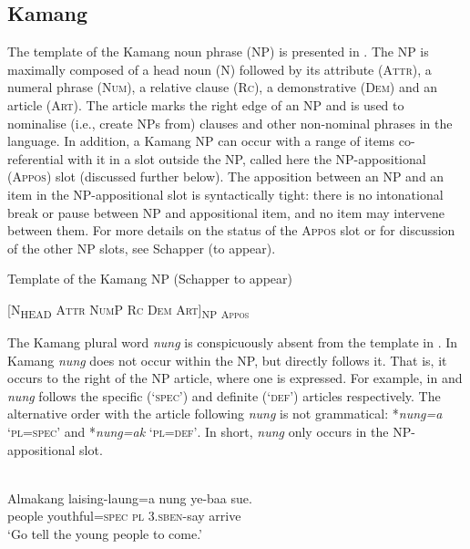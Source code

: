 \subsection{Kamang} %
\label{sec:9:3.3}
The template of the Kamang noun phrase (NP) is presented in . The NP is maximally composed of a head noun (\textsc{N}) followed by its attribute (\textsc{Attr),} a numeral phrase \textsc{(Num)}, a relative clause (\textsc{Rc}), a demonstrative \textsc{(Dem)} and an article \textsc{(Art)}. The article marks the right edge of an NP and is used to nominalise (i.e., create NPs from) clauses and other non-nominal phrases in the language. In addition, a Kamang NP can occur with a range of items co-referential with it in a slot outside the NP, called here the NP-appositional (\textsc{Appos)} slot (discussed further below). The apposition between an NP and an item in the NP-appositional slot is syntactically tight: there is no intonational break or pause between NP and appositional item, and no item may intervene between them. For more details on the status of the \textsc{Appos} slot or for discussion of the other NP slots, see Schapper (to appear).

\ea%
\label{ex:9:31}
\upshape
Template of the Kamang NP (Schapper to appear)

 [\textsc{N}\textsc{\textsubscript{HEAD}}\textsc{ Attr  NumP  Rc  Dem  Art]}\textsc{\textsubscript{NP}} \textsc{\textsubscript{Appos}}

\z


The Kamang plural word \textit{nung} is conspicuously absent from the template in . In Kamang \textit{nung} does not occur within the NP, but directly follows it. That is, it occurs to the right of the NP article, where one is expressed. For example, in  and  \textit{nung} follows the specific (`\textsc{spec}') and definite (`\textsc{def}') articles respectively. The alternative order with the article following \textit{nung} is not grammatical: *\textit{nung=a} `\textsc{pl=spec}' and *\textit{nung=ak} `\textsc{pl=def'}. In short, \textit{nung} only occurs in the NP-appositional slot.


\ea%
\label{ex:9:32}
 \\
\gll  Almakang laising-laung=a nung {ye}{{\textglotstop}}{-baa} sue. \\
  people youthful=\textsc{spec} \textsc{pl} \textsc{3.sben}-say arrive  \\
\glt `Go tell the young people to come.'
\z







